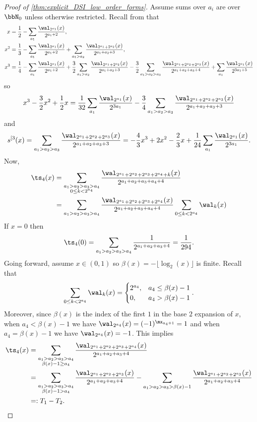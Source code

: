 \documentclass[acmsmall]{acmart}
\begin{document}
\begin{proof}[Proof of \cref{thm:explicit_DSI_low_order_forms}]
    Assume sums over $a_i$ are over $\bbN_0$ unless otherwise restricted. Recall from  that
    \begin{align*}
        x &= \frac{1}{2} - \sum_{a_1} \frac{\wal_{2^{a_1}}(x)}{2^{a_1+2}}, \\
        x^2 &= \frac{1}{3} - \sum_{a_1}\frac{\wal_{2^{a_1}}(x)}{2^{a_1+2}} + \sum_{a_1>a_2} \frac{\wal_{2^{a_1}+2^{a_2}}(x)}{2^{a_1+a_2+3}}, \\
        x^3 &= \frac{1}{4} - \sum_{a_1} \frac{\wal_{2^{a_1}}(x)}{2^{a_1+2}} + \frac{3}{2}\sum_{a_1>a_2} \frac{\wal_{2^{a_1}+2^{a_2}}(x)}{2^{a_1+a_2+3}} - \frac{3}{2} \sum_{a_1>a_2>a_3} \frac{\wal_{2^{a_1}+2^{a_2}+2^{a_3}}(x)}{2^{a_1+a_2+a_3+4}} + \sum_{a_1} \frac{\wal_{2^{a_1}}(x)}{2^{3a_1+5}}
    \end{align*}
    so
    $$x^3-\frac{3}{2}x^2+\frac{1}{2}x = \frac{1}{32} \sum_{a_1} \frac{\wal_{2^{a_1}}(x)}{2^{3a_1}} - \frac{3}{4} \sum_{a_1>a_2>a_3} \frac{\wal_{2^{a_1}+2^{a_2}+2^{a_3}}(x)}{2^{a_1+a_2+a_3+3}}$$
    and 
    $$s^{[3}(x) = \sum_{a_1>a_2>a_3} \frac{\wal_{2^{a_1}+2^{a_2}+2^{a_3}}(x)}{2^{a_1+a_2+a_3+3}} = -\frac{4}{3} x^3+ 2x^2 -\frac{2}{3}x + \frac{1}{24} \sum_{a_1} \frac{\wal_{2^{a_1}}(x)}{2^{3a_1}}.$$
    Now,
    \begin{align*}
        \ts_4(x) &= \sum_{\substack{a_1>a_2>a_3>a_4 \\ 0 \leq k < 2^{a_4}}} \frac{\wal_{2^{a_1}+2^{a_2}+2^{a_3}+2^{a_4}+k}(x)}{2^{a_1+a_2+a_3+a_4+4}} \\
        &= \sum_{a_1>a_2>a_3>a_4} \frac{\wal_{2^{a_1}+2^{a_2}+2^{a_3}+2^{a_4}}(x)}{2^{a_1+a_2+a_3+a_4+4}} \sum_{0 \leq k < 2^{a_4}} \wal_k(x) \\
    \end{align*}
    If $x=0$ then 
    $$\ts_4(0) = \sum_{a_1 > a_2 > a_3 > a_4} \frac{1}{2^{a_1+a_2+a_3+4}} = \frac{1}{294}.$$ 
    Going forward, assume $x \in (0,1)$ so $\beta(x) = - \lfloor \log_2(x) \rfloor$ is finite. Recall that 
    $$\sum_{0 \leq k < 2^{a_4}} \wal_k(x) = \begin{cases} 2^{a_4}, & a_4 \leq \beta(x)-1 \\ 0, & a_4 > \beta(x)-1 \end{cases}.$$
    Moreover, since $\beta(x)$ is the index of the first $1$ in the base $2$ expansion of $x$, when $a_4 < \beta(x)-1$ we have $\wal_{2^{a_4}}(x) = (-1)^{\mx_{a_4+1}} = 1$ and when $a_4 = \beta(x)-1$ we have $\wal_{2^{a_4}}(x) = -1$. This implies 
    \begin{align*}
        \ts_4(x) &= \sum_{\substack{a_1>a_2>a_3>a_4 \\ \beta(x)-1 \geq a_4}} \frac{\wal_{2^{a_1}+2^{a_2}+2^{a_3}+2^{a_4}}(x)}{2^{a_1+a_2+a_3+4}} \\
        &= \sum_{\substack{a_1>a_2>a_3>a_4 \\ \beta(x)-1 > a_4}} \frac{\wal_{2^{a_1}+2^{a_2}+2^{a_3}}(x)}{2^{a_1+a_2+a_3+4}} - \sum_{a_1>a_2 > a_3 > \beta(x)-1} \frac{\wal_{2^{a_1}+2^{a_2}+2^{a_3}}(x)}{2^{a_1+a_2+a_3+4}} \\
        &=: T_1 - T_2.
    \end{align*}
    

\end{proof}
\end{document}
